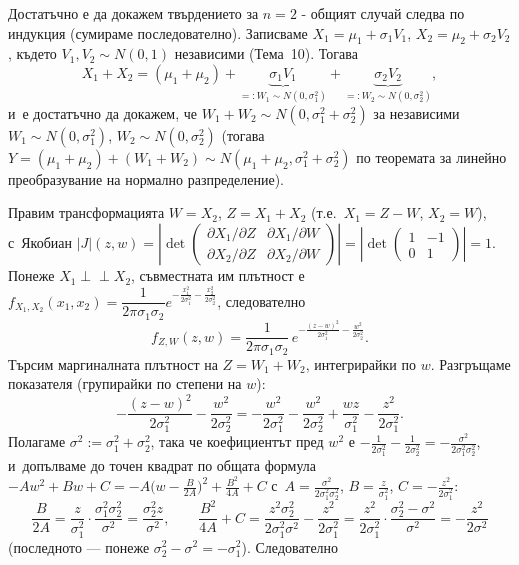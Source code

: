 \begin{proofbox}
Достатъчно е да докажем твърдението за $n=2$ - общият случай следва
по индукция (сумираме последователно). Записваме $X_1=\mu_1+
\sigma_1 V_1$, $X_2=\mu_2+\sigma_2V_2$, където $V_1,V_2\sim N(0,1)$
независими (Тема~10). Тогава
\[
  X_1+X_2 = (\mu_1+\mu_2) + \underbrace{\sigma_1V_1}_{=:W_1\sim N(0,\sigma_1^2)} + \underbrace{\sigma_2V_2}_{=:W_2\sim N(0,\sigma_2^2)},
\]
и~е достатъчно да докажем, че $W_1+W_2\sim N(0,\sigma_1^2+\sigma_2^2)$
за независими $W_1\sim N(0,\sigma_1^2)$, $W_2\sim N(0,\sigma_2^2)$
(тогава $Y=(\mu_1+\mu_2)+(W_1+W_2)\sim N(\mu_1+\mu_2,\sigma_1^2+
\sigma_2^2)$ по теоремата за линейно преобразувание на нормално
разпределение).

Правим трансформацията $W=X_2$, $Z=X_1+X_2$ (т.е.\ $X_1=Z-W$,
$X_2=W$), с~Якобиан
$|J|(z,w)=\left|\det\begin{pmatrix}\partial X_1/\partial Z & \partial X_1/\partial W\\ \partial X_2/\partial Z & \partial X_2/\partial W\end{pmatrix}\right|=\left|\det\begin{pmatrix}1&-1\\0&1\end{pmatrix}\right|=1$.
Понеже $X_1\perp\!\!\!\perp X_2$, съвместната им плътност е
$f_{X_1,X_2}(x_1,x_2)=\dfrac1{2\pi\sigma_1\sigma_2}e^{-\frac{x_1^2}{2\sigma_1^2}-\frac{x_2^2}{2\sigma_2^2}}$,
следователно
\[
  f_{Z,W}(z,w) = \frac1{2\pi\sigma_1\sigma_2}\,e^{-\frac{(z-w)^2}{2\sigma_1^2}-\frac{w^2}{2\sigma_2^2}}.
\]
Търсим маргиналната плътност на $Z=W_1+W_2$, интегрирайки по $w$.
Разгръщаме показателя (групирайки по степени на $w$):
\[
  -\frac{(z-w)^2}{2\sigma_1^2}-\frac{w^2}{2\sigma_2^2} = -\frac{w^2}{2\sigma_1^2}-\frac{w^2}{2\sigma_2^2}+\frac{wz}{\sigma_1^2}-\frac{z^2}{2\sigma_1^2}.
\]
Полагаме $\sigma^2:=\sigma_1^2+\sigma_2^2$, така че коефициентът пред
$w^2$ е $-\tfrac1{2\sigma_1^2}-\tfrac1{2\sigma_2^2}=-\tfrac{\sigma^2}
{2\sigma_1^2\sigma_2^2}$, и~допълваме до точен квадрат по общата
формула $-Aw^2+Bw+C=-A\big(w-\tfrac B{2A}\big)^2+\tfrac{B^2}{4A}+C$ с~$A=\tfrac{\sigma^2}{2\sigma_1^2\sigma_2^2}$, $B=\tfrac{z}{\sigma_1^2}$,
$C=-\tfrac{z^2}{2\sigma_1^2}$:
\[
  \frac B{2A} = \frac{z}{\sigma_1^2}\cdot\frac{\sigma_1^2\sigma_2^2}{\sigma^2} = \frac{\sigma_2^2z}{\sigma^2},
  \qquad
  \frac{B^2}{4A}+C = \frac{z^2\sigma_2^2}{2\sigma_1^2\sigma^2} - \frac{z^2}{2\sigma_1^2} = \frac{z^2}{2\sigma_1^2}\cdot\frac{\sigma_2^2-\sigma^2}{\sigma^2} = -\frac{z^2}{2\sigma^2}
\]
(последното — понеже $\sigma_2^2-\sigma^2=-\sigma_1^2$). Следователно

\end{proofbox}
